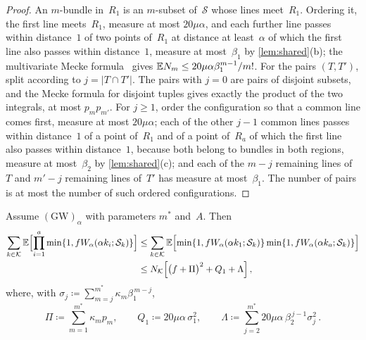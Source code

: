 \documentclass[11pt,letterpaper]{article}
\newcommand{\cS}{\mathcal S}
\begin{document}
\begin{proof}
An $m$-bundle in~$R_1$ is an $m$-subset of~$\cS$ whose lines meet~$R_1$. Ordering it, the first line meets~$R_1$, measure at most $20\mu\alpha$, and each further line passes within distance~$1$ of two points of~$R_1$ at distance at least~$\alpha$ of which the first line also passes within distance~$1$, measure at most~$\beta_1$ by \cref{lem:shared}(b); the multivariate Mecke formula~\cite[Theorem~4.4]{LP17} gives $\mathbb E N_m\le20\mu\alpha\beta_1^{m-1}/m!$. For the pairs $(T,T')$, split according to $j=\lvert T\cap T'\rvert$. The pairs with $j=0$ are pairs of disjoint subsets, and the Mecke formula for disjoint tuples gives exactly the product of the two integrals, at most $p_mp_{m'}$. For $j\ge1$, order the configuration so that a common line comes first, measure at most $20\mu\alpha$; each of the other $j-1$ common lines passes within distance~$1$ of a point of~$R_1$ and of a point of~$R_a$ of which the first line also passes within distance~$1$, because both belong to bundles in both regions, measure at most~$\beta_2$ by \cref{lem:shared}(c); and each of the $m-j$ remaining lines of~$T$ and $m'-j$ remaining lines of~$T'$ has measure at most~$\beta_1$. The number of pairs is at most the number of such ordered configurations.
\end{proof}

\begin{proposition}
\label{prop:onestep}
Assume $\mathrm{(GW)}_\alpha$ with parameters $m^*$ and~$A$. Then
\begin{equation}
\label{eq:onestep}
\begin{aligned}
  \sum_{k\in\mathcal K}\E\Bigl[\prod_{i=1}^a\min\{1,fW_\alpha(\alpha k_i;\cS_k)\}\Bigr]&\le\sum_{k\in\mathcal K}\E\Bigl[\min\{1,fW_\alpha(\alpha k_1;\cS_k)\}\min\{1,fW_\alpha(\alpha k_a;\cS_k)\}\Bigr]\\
  &\le N_{\mathcal K}\Bigl[\bigl(f+\Pi\bigr)^2+Q_1+\Lambda\Bigr]\,,
\end{aligned}
\end{equation}
where, with $\sigma_j\coloneqq\sum_{m=j}^{m^*}\kappa_m\beta_1^{\,m-j}$,
\begin{equation}
\label{eq:terms}
  \Pi\coloneqq\sum_{m=1}^{m^*}\kappa_mp_m,\qquad Q_1\coloneqq20\mu\alpha\,\sigma_1^2,\qquad\Lambda\coloneqq\sum_{j=2}^{m^*}20\mu\alpha\,\beta_2^{\,j-1}\sigma_j^2\,.
\end{equation}
\end{proposition}
\end{document}
